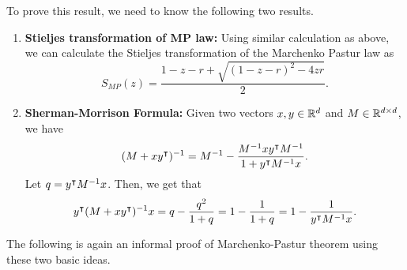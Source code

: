 \documentclass[12pt]{article}
\begin{document}
To prove this result, we need to know the following two results.

\begin{enumerate}
    \item \textbf{Stieljes transformation of MP law:} Using similar calculation as above, we can calculate the Stieljes transformation of the Marchenko Pastur law as 
    \begin{equation*}
        S_{MP}(z) = \dfrac{1 - z - r + \sqrt{(1-z-r)^2 - 4zr}}{2}.
    \end{equation*}
    \item \textbf{Sherman-Morrison Formula:} Given two vectors $x, y \in \mathbb{R}^d$ and $M \in \mathbb{R}^{d\times d}$, we have
    \begin{equation*}
        (M + xy^{\intercal})^{-1} = M^{-1} - \dfrac{M^{-1} xy^{\intercal} M^{-1}}{1 + y^{\intercal} M^{-1}x}.
    \end{equation*}
    \noindent Let $q = y^{\intercal} M^{-1}x$. Then, we get that
    \begin{equation*}
        y^{\intercal} (M + xy^{\intercal})^{-1}x 
        = q - \dfrac{q^2}{1 + q} = 1 - \dfrac{1}{1+q}
        = 1 - \dfrac{1}{y^{\intercal} M^{-1}x}.
    \end{equation*}
\end{enumerate}

The following is again an informal proof of Marchenko-Pastur theorem using these two basic ideas.
\end{document}
